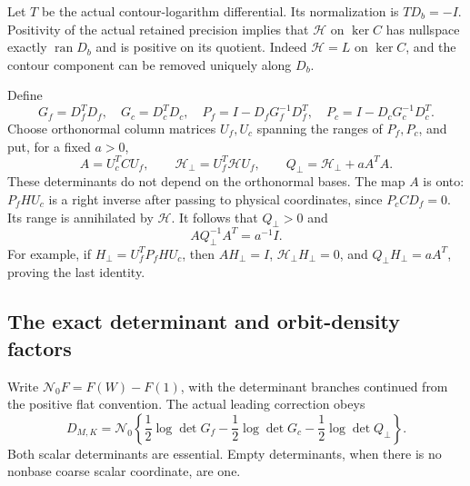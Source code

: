 Let $T$ be the actual contour-logarithm differential. Its normalization
is $TD_b=-I$. Positivity of the actual retained precision implies that
$\mathcal H$ on $\ker C$ has nullspace exactly $\operatorname{ran}D_b$
and is positive on its quotient. Indeed $\mathcal H=L$ on $\ker C$,
and the contour component can be removed uniquely along $D_b$.

Define
\begin{equation}
 G_f=D_f^TD_f,\quad G_c=D_c^TD_c,\quad
 P_f=I-D_fG_f^{-1}D_f^T,\quad
 P_c=I-D_cG_c^{-1}D_c^T.\label{pqd-projections}
\end{equation}
Choose orthonormal column matrices $U_f,U_c$ spanning the ranges of
$P_f,P_c$, and put, for a fixed $a>0$,
\begin{equation}
 A=U_c^TCU_f,\qquad \mathcal H_\perp=U_f^T\mathcal H U_f,
 \qquad Q_\perp=\mathcal H_\perp+aA^TA.
 \label{pqd-physical-precision}
\end{equation}
These determinants do not depend on the orthonormal bases.
The map $A$ is onto: $P_fHU_c$ is a right inverse after passing to
physical coordinates, since $P_cCD_f=0$. Its range is annihilated by
$\mathcal H$. It follows that $Q_\perp>0$ and
\begin{equation}
 A Q_\perp^{-1}A^T=a^{-1}I.\label{pqd-compression}
\end{equation}
For example, if $H_\perp=U_f^TP_fHU_c$, then
$AH_\perp=I$, $\mathcal H_\perp H_\perp=0$, and
$Q_\perp H_\perp=aA^T$, proving the last identity.

\subsection{The exact determinant and orbit-density factors}
\label{pqd-identity-section}

Write $\mathcal N_0F=F(W)-F(1)$, with the determinant branches continued
from the positive flat convention. The actual leading correction obeys
\begin{equation}
 \boxed{\displaystyle
 D_{M,K}=\mathcal N_0\left\{
 \frac12\log\det G_f-\frac12\log\det G_c
                         -\frac12\log\det Q_\perp\right\}.}
 \label{pqd-main}
\end{equation}
Both scalar determinants are essential. Empty determinants, when there
is no nonbase coarse scalar coordinate, are one.

